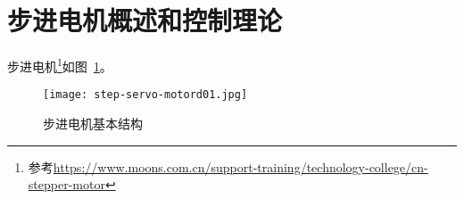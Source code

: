 \section{步进电机概述和控制理论}


步进电机\footnote{参考\url{https://www.moons.com.cn/support-training/technology-college/cn-stepper-motor}}如图~\ref{fig:Stepper-Motor-Open}。

\begin{figure}[htbp]
    \centering
    \texttt{[image: step-servo-motord01.jpg]}
    \caption{步进电机基本结构}
    \label{fig:Stepper-Motor-Open}
\end{figure}





